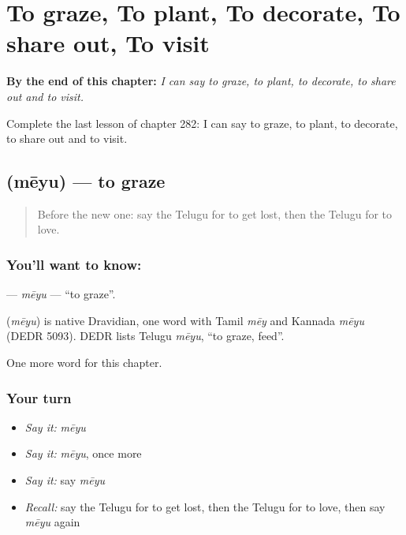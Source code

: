 
\chapter{To graze, To plant, To decorate, To share out, To visit}
\label{ch:te-to-graze-to-plant-to-decorate-to-share-out-to-visit}

\begin{chapteropening}
\textbf{By the end of this chapter:} \emph{I can say to graze, to plant, to decorate, to share out and to visit.}

Complete the last lesson of chapter 282: I can say to graze, to plant, to decorate, to share out and to visit.
\end{chapteropening}

\section[\texorpdfstring{\te{మేయు} (mēyu)}{మేయు (mēyu)}]{ (mēyu) — to graze}

\label{lesson:TE-C282-meyu}



\begin{quote}
Before the new one: say the Telugu for to get lost, then the Telugu for to love.
\end{quote}

\subsection*{You'll want to know: }
\textbf{} — \emph{mēyu} — \textquotedblleft{}to graze\textquotedblright{}.

\begin{cousinweb}
\textbf{} (\emph{mēyu}) is native Dravidian, one word with Tamil \emph{mēy} and Kannada \emph{mēyu} (DEDR 5093). DEDR lists Telugu \emph{mēyu}, \textquotedblleft{}to graze, feed\textquotedblright{}.
\end{cousinweb}

\begin{grammarlens}[title={What you've built}]
One more word for this chapter.
\end{grammarlens}

\subsection*{Your turn}
\begin{itemize}
\raggedright
  \item \emph{Say it:} \emph{mēyu}
  \item \emph{Say it:} \emph{mēyu}, once more
  \item \emph{Say it:} say \emph{mēyu}
  \item \emph{Recall:} say the Telugu for to get lost, then the Telugu for to love, then say \emph{mēyu} again
\end{itemize}

